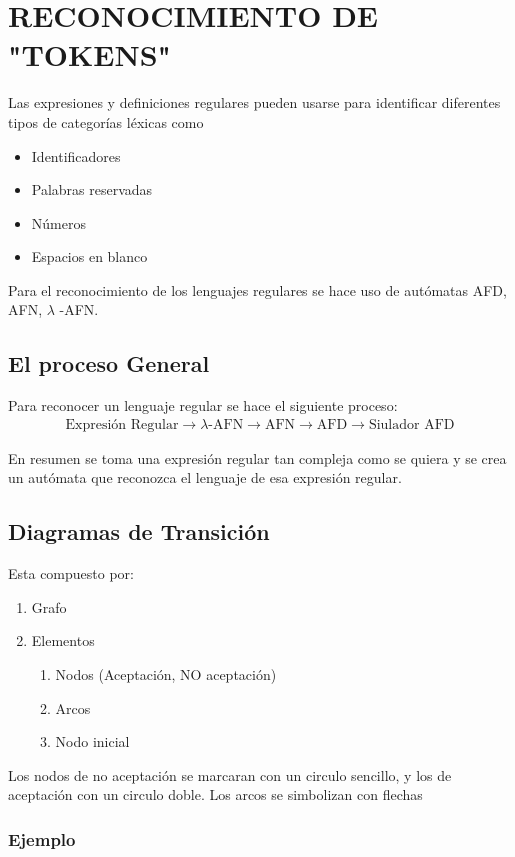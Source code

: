 \section{RECONOCIMIENTO DE "TOKENS"}
Las expresiones y definiciones regulares pueden usarse para identificar diferentes tipos de categorías léxicas como 
\begin{itemize}
    \item Identificadores
    \item Palabras reservadas
    \item Números
    \item Espacios en blanco
\end{itemize}

Para el reconocimiento de los lenguajes regulares se hace uso de autómatas AFD, AFN, $\lambda$ -AFN.

\subsection{El proceso General}
Para reconocer un lenguaje regular se hace el siguiente proceso:
\begin{align*}
    \text{Expresión Regular} \rightarrow \lambda\text{-AFN}\rightarrow \text{AFN}\rightarrow \text{AFD}\rightarrow \text{Siulador AFD}
\end{align*}

En resumen se toma una expresión regular tan compleja como se quiera y se crea un autómata que reconozca el lenguaje de esa expresión regular.

\subsection{Diagramas de Transición}
Esta compuesto por:
\begin{enumerate}
    \item Grafo
    \item Elementos
    \begin{enumerate}
        \item Nodos (Aceptación, NO aceptación)
        \item Arcos
        \item Nodo inicial
    \end{enumerate}
\end{enumerate}
Los nodos de no aceptación se marcaran con un circulo sencillo, y los de aceptación con un circulo doble. Los arcos se simbolizan con flechas
\subsubsection*{Ejemplo}

